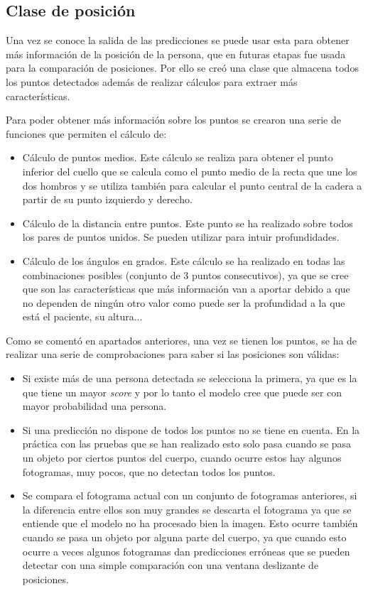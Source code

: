 \subsection{Clase de posición}
Una vez se conoce la salida de las predicciones se puede usar esta para obtener más información de la posición de la persona, que en futuras etapas fue usada para la comparación de posiciones. Por ello se creó una clase que almacena todos los puntos detectados además de realizar cálculos para extraer más características.

Para poder obtener más información sobre los puntos se crearon una serie de funciones que permiten el cálculo de:
\begin{itemize}
	\item Cálculo de puntos medios. Este cálculo se realiza para obtener el punto inferior del cuello que se calcula como el punto medio de la recta que une los dos hombros y se utiliza también para calcular el punto central de la cadera a partir de su punto izquierdo y derecho.
	\item Cálculo de la distancia entre puntos. Este punto se ha realizado sobre todos los pares de puntos unidos. Se pueden utilizar para intuir profundidades.
	\item Cálculo de los ángulos en grados. Este cálculo se ha realizado en todas las combinaciones posibles (conjunto de 3 puntos consecutivos), ya que se cree que son las características que más información van a aportar debido a que no dependen de ningún otro valor como puede ser la profundidad a la que está el paciente, su altura...
\end{itemize}

Como se comentó en apartados anteriores, una vez se tienen los puntos, se ha de realizar una serie de comprobaciones para saber si las posiciones son válidas:
\begin{itemize}
	\item Si existe más de una persona detectada se selecciona la primera, ya que es la que tiene un mayor \textit{score} y por lo tanto el modelo cree que puede ser con mayor probabilidad una persona.
	\item Si una predicción no dispone de todos los puntos no se tiene en cuenta. En la práctica con las pruebas que se han realizado esto solo pasa cuando se pasa un objeto por ciertos puntos del cuerpo, cuando ocurre estos hay algunos fotogramas, muy pocos, que no detectan todos los puntos.
	\item Se compara el fotograma actual con un conjunto de fotogramas anteriores, si la diferencia entre ellos son muy grandes se descarta el fotograma ya que se entiende que el modelo no ha procesado bien la imagen. Esto ocurre también cuando se pasa un objeto por alguna parte del cuerpo, ya que cuando esto ocurre a veces algunos fotogramas dan predicciones erróneas que se pueden detectar con una simple comparación con una ventana deslizante de posiciones.
\end{itemize}


